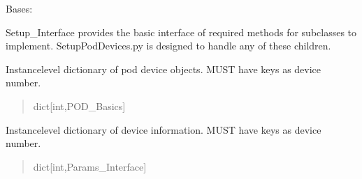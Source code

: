 \documentclass[letterpaper,10pt,english]{sphinxmanual}
\begin{document}
\begin{fulllineitems}
\label{\detokenize{Setup.SetupOneDevice:Setup.SetupOneDevice.Setup_PodInterface.SetupInterface}}
\pysigstartsignatures
{}
\pysigstopsignatures
\sphinxAtStartPar
Bases: 

\sphinxAtStartPar
Setup\_Interface provides the basic interface of required methods for subclasses to implement.     SetupPodDevices.py is designed to handle any of these children.

\begin{fulllineitems}
\label{\detokenize{Setup.SetupOneDevice:Setup.SetupOneDevice.Setup_PodInterface.SetupInterface._podDevices}}
\pysigstartsignatures
{}
\pysigstopsignatures
\sphinxAtStartPar
Instance\sphinxhyphen{}level dictionary of pod device objects. MUST have             keys as device number.
\begin{quote}\begin{description}
\sphinxAtStartPar
dict{[}int,POD\_Basics{]}

\end{description}\end{quote}

\end{fulllineitems}


\begin{fulllineitems}
\label{\detokenize{Setup.SetupOneDevice:Setup.SetupOneDevice.Setup_PodInterface.SetupInterface._podParametersDict}}
\pysigstartsignatures
{}
\pysigstopsignatures
\sphinxAtStartPar
Instance\sphinxhyphen{}level dictionary of device information. MUST have keys as device number.
\begin{quote}\begin{description}
\sphinxAtStartPar
dict{[}int,Params\_Interface{]}


\end{description}
\end{quote}
\end{fulllineitems}
\end{fulllineitems}
\end{document}
